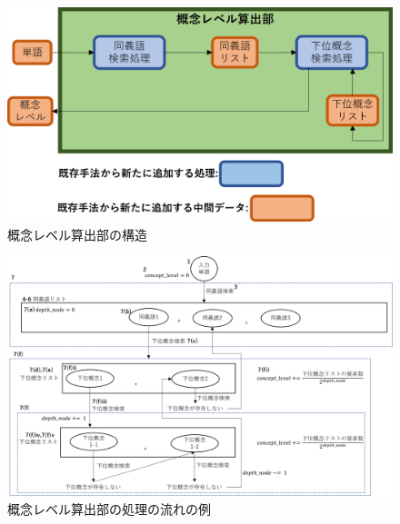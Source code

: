 \begin{figure}[t]
    \begin{center}
        \includegraphics[width=1.0\columnwidth]{image/vgml_concept_level_structure.png}
        \caption{概念レベル算出部の構造}
        \label{fig:vgml_concept_level_structure}
    \end{center}
\end{figure}

\begin{figure}[t]
    \begin{center}
        \includegraphics[width=1.0\columnwidth]{image/flow_calc_concept_level.png}
        \caption{概念レベル算出部の処理の流れの例}
        \label{fig:flow_calc_concept_level}
    \end{center}
\end{figure}

